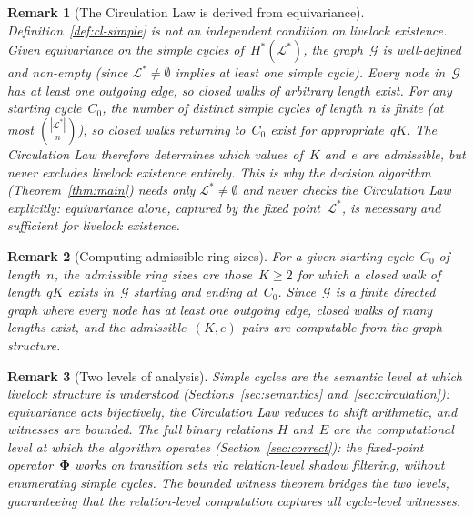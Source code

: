 \documentclass{article}
\newtheorem{remark}{Remark}
\newcommand{\Ls}{\mathcal{L}^{*}}
\newcommand{\bPhi}{\boldsymbol{\Phi}}
\newcommand{\Hstar}{H^{*}}
\begin{document}
\begin{remark}[The Circulation Law is derived from equivariance]
\label{rem:cl-derived}
Definition~\ref{def:cl-simple} is not an independent condition on
livelock existence.
Given equivariance on the simple cycles of~$\Hstar(\Ls)$,
the graph~$\mathcal{G}$ is well-defined and non-empty
(since $\Ls\neq\emptyset$ implies at least one simple cycle).
Every node in~$\mathcal{G}$ has at least one outgoing edge,
so closed walks of arbitrary length exist.
For any starting cycle~$C_0$, the number of distinct simple
cycles of length~$n$ is finite (at most $\binom{|\Ls|}{n}$),
so closed walks returning to~$C_0$ exist for appropriate~$qK$.
The Circulation Law therefore determines \emph{which}
values of~$K$ and~$e$ are admissible, but never excludes
livelock existence entirely.
This is why the decision algorithm (Theorem~\ref{thm:main}) needs
only $\Ls\neq\emptyset$ and never checks the Circulation Law
explicitly: equivariance alone, captured by the fixed point~$\Ls$,
is necessary and sufficient for livelock existence.
\end{remark}

\begin{remark}[Computing admissible ring sizes]
For a given starting cycle~$C_0$ of length~$n$,
the admissible ring sizes are those~$K\geq 2$ for which
a closed walk of length~$qK$ exists in~$\mathcal{G}$
starting and ending at~$C_0$.
Since~$\mathcal{G}$ is a finite directed graph where every
node has at least one outgoing edge, closed walks of many
lengths exist, and the admissible~$(K, e)$ pairs are
computable from the graph structure.
\end{remark}

\begin{remark}[Two levels of analysis]
Simple cycles are the \emph{semantic} level at which livelock
structure is understood (Sections~\ref{sec:semantics}
and~\ref{sec:circulation}): equivariance acts bijectively,
the Circulation Law reduces to shift arithmetic, and witnesses
are bounded.
The full binary relations $H$ and~$E$ are the \emph{computational}
level at which the algorithm operates (Section~\ref{sec:correct}):
the fixed-point operator~$\bPhi$ works on transition sets via
relation-level shadow filtering, without enumerating simple cycles.
The bounded witness theorem bridges the two levels, guaranteeing
that the relation-level computation captures all cycle-level witnesses.
\end{remark}

\end{document}
